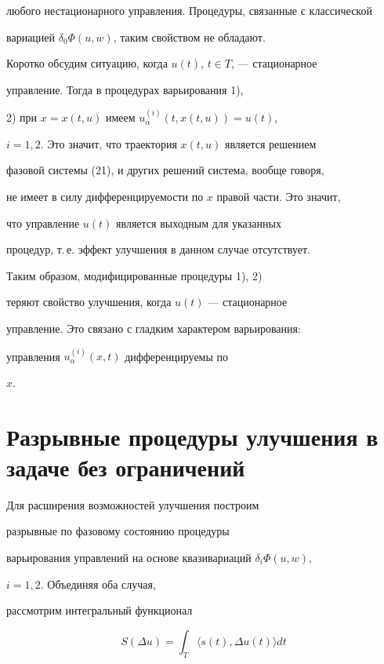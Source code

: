 любого нестационарного управления. Процедуры, связанные с классической 


вариацией $\delta_{0}\Phi(u,w)$, таким свойством не обладают.





Коротко обсудим ситуацию, когда $u(t)$, $t\in T$, --- стационарное 


управление. Тогда в процедурах варьирования 1),


2) при $x=x(t,u)$ имеем $u_{\alpha}^{(i)}(t, x(t,u))=u(t)$,


$i=1, 2$. Это значит, что траектория $x(t,u)$ является решением 


фазовой системы (21), и других решений система, вообще говоря, 


не имеет в силу дифференцируемости по $x$ правой части. Это значит, 


что управление $u(t)$ является выходным для указанных


процедур, т.\,е. эффект улучшения в данном случае отсутствует.





Таким образом, модифицированные процедуры 1), 2) 


теряют свойство улучшения, когда $u(t)$ --- стационарное


управление. Это связано с гладким характером варьирования: 


управления $u_{\alpha}^{(i)}(x,t)$ дифференцируемы по


$x$.





\section{Разрывные процедуры улучшения в задаче без ограничений}





Для расширения возможностей улучшения построим 


разрывные по фазовому состоянию процедуры


варьирования управлений на основе квазивариаций $\delta_{i}\Phi (u,w)$,


$i=1,2$. Объединяя оба случая,


рассмотрим интегральный функционал


\begin{equation}


S(\Delta u)=\int_{T} \langle s(t), \Delta u(t)\rangle dt


\end{equation}


